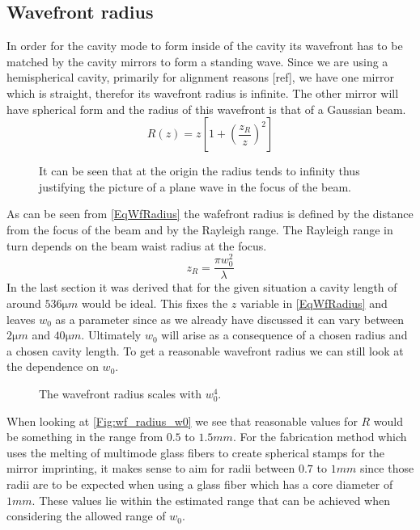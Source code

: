 \subsection{Wavefront radius}
In order for the cavity mode to form inside of the cavity its wavefront has to be matched by the cavity mirrors to form a standing wave. Since we are using a hemispherical cavity, primarily for alignment reasons [ref], we have one mirror which is straight, therefor its wavefront radius is infinite. The other mirror will have spherical form and the radius of this wavefront is that of a Gaussian beam.
\begin{equation}\label{EqWfRadius}
	R(z)=z\left[1+\left(\frac{z_{\si{R}}}{z}\right)^2\right]
\end{equation}
\begin{figure}[H]
	
	\caption{It can be seen that at the origin the radius tends to infinity thus justifying the picture of a plane wave in the focus of the beam.}
\end{figure}
As can be seen from \autoref{EqWfRadius} the wafefront radius is defined by the distance from the focus of the beam and by the Rayleigh range. The Rayleigh range in turn depends on the beam waist radius at the focus.
\begin{equation}\label{EqRayleighRange}
	z_{\si{R}}=\frac{\pi w_0^2}{\lambda}
\end{equation}
In the last section it was derived that for the given situation a cavity length of around $536\si{\micro m}$ would be ideal. This fixes the $z$ variable in \autoref{EqWfRadius} and leaves $w_0$ as a parameter since as we already have discussed it can vary between $2\si{\micro m}$ and $40\si{\micro m}$. Ultimately $w_0$ will arise as a consequence of a chosen radius and a chosen cavity length. To get a reasonable wavefront radius we can still look at the dependence on $w_0$.
\begin{figure}[H]
	
	\caption{The wavefront radius scales with $w_0^4$.}
	\label{Fig:wf_radius_w0}
\end{figure}
When looking at \autoref{Fig:wf_radius_w0} we see that reasonable values for $R$ would be something in the range from $0.5$ to $1.5\si{mm}$. For the fabrication method which uses the melting of multimode glass fibers to create spherical stamps for the mirror imprinting, it makes sense to aim for radii between $0.7$ to $1 \si{mm}$ since those radii are to be expected when using a glass fiber which has a core diameter of $1\si{mm}$. These values lie within the estimated range that can be achieved when considering the allowed range of $w_0$.

